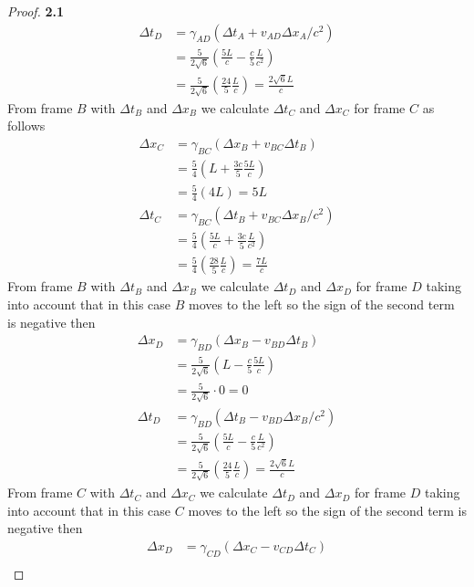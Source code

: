 \documentclass[11pt]{article}
\theoremstyle{definition}
\begin{document}
\begin{proof}{\textbf{2.1}}
\begin{align*}
            \Delta t_D &= \gamma_{AD} (\Delta t_A + v_{AD}\Delta x_A/c^2)\\
                &= \frac{5}{2\sqrt{6}}(\frac{5L}{c} - \frac{c}{5}\frac{L}{c^2}) \\
                &= \frac{5}{2\sqrt{6}}(\frac{24}{5}\frac{L}{c}) = \frac{2\sqrt{6}L}{c}
        \end{align*}
        From frame $B$ with $\Delta t_B$ and $\Delta x_B$ we calculate $\Delta t_C$ and
        $\Delta x_C$ for frame $C$ as follows
        \begin{align*}
            \Delta x_C &= \gamma_{BC}(\Delta x_B + v_{BC}\Delta t_B)\\
                &= \frac{5}{4}(L + \frac{3c}{5}\frac{5L}{c}) \\
                &= \frac{5}{4}(4L) = 5L \\
            \Delta t_C &= \gamma_{BC} (\Delta t_B + v_{BC}\Delta x_B/c^2)\\
                &= \frac{5}{4}(\frac{5L}{c} + \frac{3c}{5}\frac{L}{c^2}) \\
                &= \frac{5}{4}(\frac{28}{5}\frac{L}{c}) = \frac{7L}{c}
        \end{align*}
\cleardoublepage
        From frame $B$ with $\Delta t_B$ and $\Delta x_B$ we calculate $\Delta t_D$ and
        $\Delta x_D$ for frame $D$ taking into account that in this case $B$ moves
        to the left so the sign of the second term is negative then 
        \begin{align*}
            \Delta x_D &= \gamma_{BD}(\Delta x_B - v_{BD}\Delta t_B)\\
                &= \frac{5}{2\sqrt{6}}(L - \frac{c}{5}\frac{5L}{c}) \\
                &= \frac{5}{2\sqrt{6}} \cdot 0 = 0 \\
            \Delta t_D &= \gamma_{BD} (\Delta t_B - v_{BD}\Delta x_B/c^2)\\
                &= \frac{5}{2\sqrt{6}}(\frac{5L}{c} - \frac{c}{5}\frac{L}{c^2}) \\
                &= \frac{5}{2\sqrt{6}}(\frac{24}{5}\frac{L}{c}) = \frac{2\sqrt{6}L}{c}
        \end{align*}
        From frame $C$ with $\Delta t_C$ and $\Delta x_C$ we calculate $\Delta t_D$ and
        $\Delta x_D$ for frame $D$ taking into account that in this case $C$ moves
        to the left so the sign of the second term is negative then 
        \begin{align*}
            \Delta x_D &= \gamma_{CD}(\Delta x_C - v_{CD}\Delta t_C)\\

\end{align*}
\end{proof}
\end{document}
